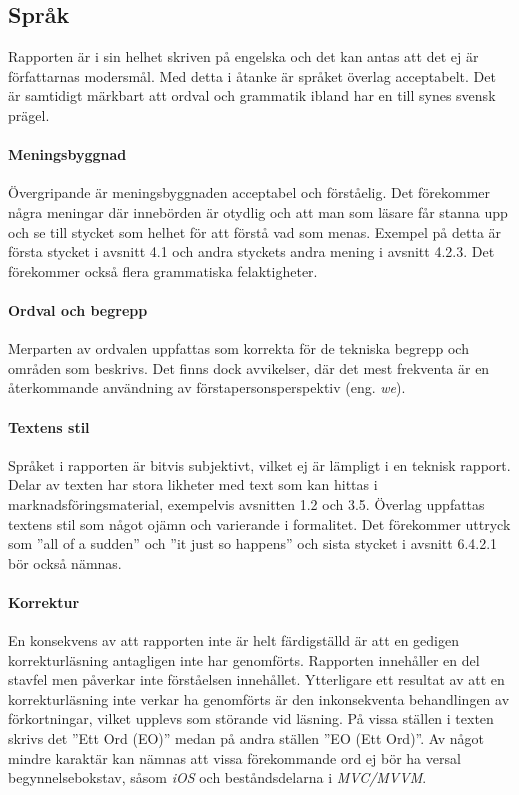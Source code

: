 
    \subsection{Språk} %
    \label{sub:sprak}
    Rapporten är i sin helhet skriven på engelska och det kan antas att det ej är författarnas modersmål. Med detta i åtanke är språket överlag acceptabelt. Det är samtidigt märkbart att ordval och grammatik ibland har en till synes svensk prägel.

    \paragraph{Meningsbyggnad}
        Övergripande är meningsbyggnaden acceptabel och förståelig. Det förekommer några meningar där innebörden är otydlig och att man som läsare får stanna upp och se till stycket som helhet för att förstå vad som menas. Exempel på detta är första stycket i avsnitt 4.1 och andra styckets andra mening i avsnitt 4.2.3. Det förekommer också flera grammatiska felaktigheter.

    \paragraph{Ordval och begrepp}
        Merparten av ordvalen uppfattas som korrekta för de tekniska begrepp och områden som beskrivs. Det finns dock avvikelser, där det mest frekventa är en återkommande användning av förstapersonsperspektiv (eng. \emph{we}). 

    \paragraph{Textens stil}
        Språket i rapporten är bitvis subjektivt, vilket ej är lämpligt i en teknisk rapport. Delar av texten har stora likheter med text som kan hittas i marknadsföringsmaterial, exempelvis avsnitten 1.2 och 3.5. Överlag uppfattas textens stil som något ojämn och varierande i formalitet. Det förekommer uttryck som ''all of a sudden'' och ''it just so happens'' och sista stycket i avsnitt 6.4.2.1 bör också nämnas. 

    \paragraph{Korrektur}
        En konsekvens av att rapporten inte är helt färdigställd är att en gedigen korrekturläsning antagligen inte har genomförts. Rapporten innehåller en del stavfel men påverkar inte förståelsen innehållet. Ytterligare ett resultat av att en korrekturläsning inte verkar ha genomförts är den inkonsekventa behandlingen av förkortningar, vilket upplevs som störande vid läsning. På vissa ställen i texten skrivs det ''Ett Ord (EO)'' medan på andra ställen ''EO (Ett Ord)''. Av något mindre karaktär kan nämnas att vissa förekommande ord ej bör ha versal begynnelsebokstav, såsom \emph{iOS} och beståndsdelarna i \emph{MVC/MVVM}. 

